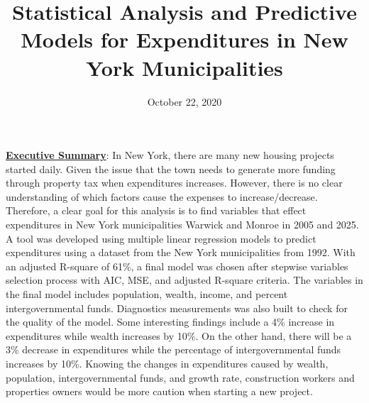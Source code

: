 \documentclass[11pt]{article}\usepackage[]{graphicx}\usepackage[]{color}
\title{Statistical Analysis and Predictive Models for Expenditures in New York Municipalities\vspace{-5ex}}
\date{October 22, 2020\vspace{-5ex}}
\begin{document}
 
\maketitle
\hfill \break








\noindent\textbf{\underline{Executive Summary}}: In New York, there are many new housing projects started daily. Given the issue that the town needs to generate more funding through property tax when expenditures increases. However, there is no clear understanding of which factors cause the expenses to increase/decrease. Therefore, a clear goal for this analysis is to find variables that effect expenditures in New York municipalities Warwick and Monroe in 2005 and 2025. A tool was developed using multiple linear regression models to predict expenditures using a dataset from the New York municipalities from 1992. With an adjusted R-square of 61\%, a final model was chosen after stepwise variables selection process with AIC, MSE, and adjusted R-square criteria. The variables in the final model includes population, wealth, income, and percent intergovernmental funds. Diagnostics measurements was also built to check for the quality of the model. Some interesting findings include a 4\% increase in expenditures while wealth increases by 10\%. On the other hand, there will be a 3\% decrease in expenditures while the percentage of intergovernmental funds increases by 10\%. Knowing the changes in expenditures caused by wealth, population, intergovernmental funds, and growth rate, construction workers and properties owners would be more caution when starting a new project.            
\hfill \break
\end{document}

